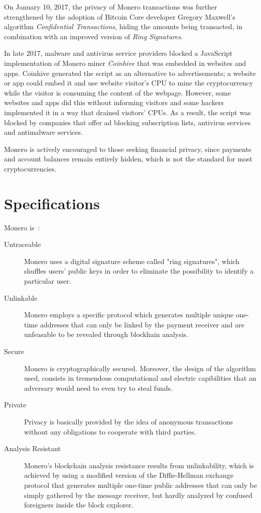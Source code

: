 On January 10, 2017, the privacy of Monero transactions was further strengthened by the adoption of Bitcoin Core developer Gregory Maxwell's algorithm \emph{Confidential Transactions}, hiding the amounts being transacted, in combination with an improved version of \emph{Ring Signatures}.

In late 2017, malware and antivirus service providers blocked a JavaScript implementation of Monero miner \emph{Coinhive} that was embedded in websites and apps. Coinhive generated the script as an alternative to advertisements; a website or app could embed it and use website visitor's CPU to mine the cryptocurrency while the visitor is consuming the content of the webpage. However, some websites and apps did this without informing visitors and some hackers implemented it in a way that drained visitors' CPUs. As a result, the script was blocked by companies that offer ad blocking subscription lists, antivirus services and antimalware services.

Monero is actively encouraged to those seeking financial privacy, since payments and account balances remain entirely hidden, which is not the standard for most cryptocurrencies.

\section{Specifications}
Monero is~\cite{monero}:
\begin{description}
  \item [Untraceable] Monero uses a digital signature scheme called "ring signatures", which shuffles users' public keys in order to eliminate the possibility to identify a particular user.
  \item [Unlinkable] Monero employs a specific protocol which generates multiple unique one-time addresses that can only be linked by the payment receiver and are unfeasable to be revealed through blockhain analysis.
  \item [Secure] Monero is cryptographically secured. Moreover, the design of the algorithm used, consists in tremendous computational and electric capibilities that an adversary would need to even try to steal funds.
  \item [Private] Privacy is basically provided by the idea of anonymous transactions without any obligations to cooperate with third parties.
  \item [Analysis Resistant] Monero's blockchain analysis resistance results from unlinkability, which is achieved by using a modified version of the Diffie-Hellman exchange protocol that generates multiple one-time public addresses that can only be simply gathered by the message receiver, but hardly analyzed by confused foreigners inside the block explorer.
\end{description}


